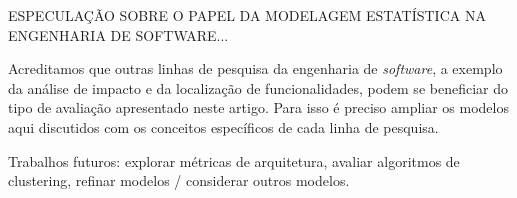 \documentclass{acm_proc_article-sp}
\begin{document}

ESPECULAÇÃO SOBRE O PAPEL DA MODELAGEM ESTATÍSTICA NA ENGENHARIA DE SOFTWARE...


Acreditamos que outras linhas de pesquisa da engenharia de \emph{software}, a exemplo da análise de impacto e da localização de funcionalidades, podem se beneficiar do tipo de avaliação apresentado neste artigo. Para isso é preciso ampliar os modelos aqui discutidos com os conceitos específicos de cada linha de pesquisa.

Trabalhos futuros: explorar métricas de arquitetura, avaliar algoritmos de clustering, refinar modelos / considerar outros modelos.


%


\end{document}
